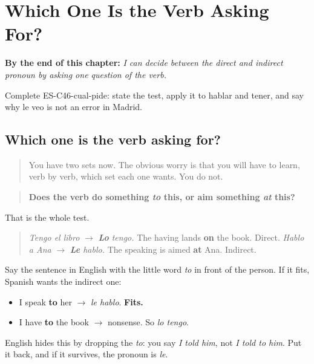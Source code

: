 
\chapter{Which One Is the Verb Asking For?}
\label{ch:which-object}

\begin{chapteropening}
\textbf{By the end of this chapter:} \emph{I can decide between the direct and indirect pronoun by asking one question of the verb.}

Complete ES-C46-cual-pide: state the test, apply it to hablar and tener, and say why le veo is not an error in Madrid.
\end{chapteropening}

\section[lo tengo / le hablo]{Which one is the verb asking for?}

\label{lesson:ES-C46-cual-pide}



\begin{quote}
You have two sets now. The obvious worry is that you will have to learn, verb by verb, which set each one wants. You do not.
\end{quote}

\begin{grammarlens}[title={Grammar Lens: ask the verb one question}]
\begin{quote}
\textbf{Does the verb do something \emph{to} this, or aim something \emph{at} this?}
\end{quote}

That is the whole test.

\begin{quote}
\emph{Tengo el libro} $\to$ \emph{\textbf{Lo} tengo.} The having lands \textbf{on} the book. Direct. \emph{Hablo a Ana} $\to$ \emph{\textbf{Le} hablo.} The speaking is aimed \textbf{at} Ana. Indirect.
\end{quote}

Say the sentence in English with the little word \emph{to} in front of the person. If it fits, Spanish wants the indirect one:

\begin{itemize}
\raggedright
  \item I speak \textbf{to} her $\to$ \emph{le hablo}. \textbf{Fits.}
  \item I have \textbf{to} the book $\to$ nonsense. So \emph{lo tengo}.
\end{itemize}

English hides this by dropping the \emph{to}: you say \emph{I told him}, not \emph{I told to him}. Put it back, and if it survives, the pronoun is \emph{le}.
\end{grammarlens}

